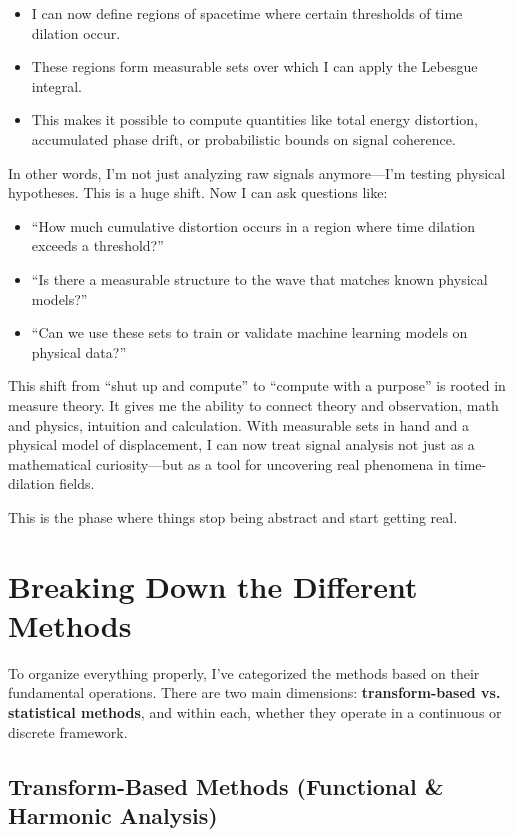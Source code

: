 \documentclass{article}
\begin{document}
\begin{itemize} \item I can now define regions of spacetime where certain thresholds of time dilation occur. \item These regions form measurable sets over which I can apply the Lebesgue integral. \item This makes it possible to compute quantities like total energy distortion, accumulated phase drift, or probabilistic bounds on signal coherence. \end{itemize}

In other words, I’m not just analyzing raw signals anymore—I’m testing physical hypotheses. This is a huge shift. Now I can ask questions like:

\begin{itemize} \item “How much cumulative distortion occurs in a region where time dilation exceeds a threshold?” \item “Is there a measurable structure to the wave that matches known physical models?” \item “Can we use these sets to train or validate machine learning models on physical data?” \end{itemize}

This shift from “shut up and compute” to “compute with a purpose” is rooted in measure theory. It gives me the ability to connect theory and observation, math and physics, intuition and calculation. With measurable sets in hand and a physical model of displacement, I can now treat signal analysis not just as a mathematical curiosity—but as a tool for uncovering real phenomena in time-dilation fields.

This is the phase where things stop being abstract and start getting real.

\section{Breaking Down the Different Methods}

To organize everything properly, I’ve categorized the methods based on their fundamental operations. There are two main dimensions: \textbf{transform-based vs. statistical methods}, and within each, whether they operate in a continuous or discrete framework.

\subsection{Transform-Based Methods (Functional \& Harmonic Analysis)}
\end{document}
